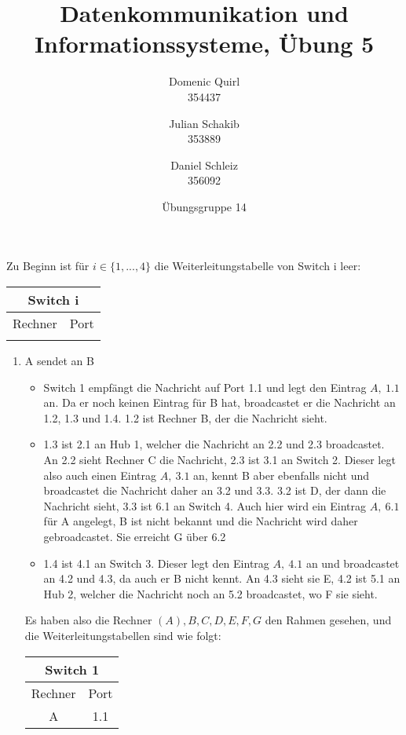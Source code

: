\documentclass{../exercisesheet}
\title{Datenkommunikation und Informationssysteme, Übung 5}
\author{
    Domenic Quirl \\ 354437
    \and
    Julian Schakib \\ 353889
    \and 
    Daniel Schleiz \\ 356092
}
\date{Übungsgruppe 14}
\begin{document}
\maketitle
\pointtable


\begin{exercise}{4}
\begin{subexercise}
Zu Beginn ist für $i \in \{1,...,4\}$ die Weiterleitungstabelle von Switch i leer:\\
\begin{center}
\begin{tabular}{c|c}
\multicolumn{2}{c}{Switch i}\\
\hline
Rechner & Port\\
\hline
  &  \\
\end{tabular}
\end{center}
\begin{enumerate}
\item A sendet an B
\begin{itemize}
\item Switch 1 empfängt die Nachricht auf Port 1.1 und legt den Eintrag $A,\ 1.1$ an. Da er noch keinen Eintrag für B hat, broadcastet er die Nachricht an 1.2, 1.3 und 1.4. 1.2 ist Rechner B, der die Nachricht sieht. 
\item 1.3 ist 2.1 an Hub 1, welcher die Nachricht an 2.2 und 2.3 broadcastet. An 2.2 sieht Rechner C die Nachricht, 2.3 ist 3.1 an Switch 2. Dieser legt also auch einen Eintrag $A,\ 3.1$ an, kennt B aber ebenfalls nicht und broadcastet die Nachricht daher an 3.2 und 3.3. 3.2 ist D, der dann die Nachricht sieht, 3.3 ist 6.1 an Switch 4. Auch hier wird ein Eintrag $A,\ 6.1$  für A angelegt, B ist nicht bekannt und die Nachricht wird daher gebroadcastet. Sie erreicht G über 6.2
\item 1.4 ist 4.1 an Switch 3. Dieser legt den Eintrag $A,\ 4.1$ an und broadcastet an 4.2 und 4.3, da auch er B nicht kennt. An 4.3 sieht sie E, 4.2 ist 5.1 an Hub 2, welcher die Nachricht noch an 5.2 broadcastet, wo F sie sieht.
\end{itemize}
Es haben also die Rechner $(A), B, C, D, E, F, G$ den Rahmen gesehen, und die Weiterleitungstabellen sind wie folgt:\\
\begin{center}
\begin{tabular}{c|c}
\multicolumn{2}{c}{Switch 1}\\
\hline
Rechner & Port\\
\hline
A & 1.1 \\

\end{tabular}
\end{center}
\end{enumerate}
\end{subexercise}
\end{exercise}
\end{document}
